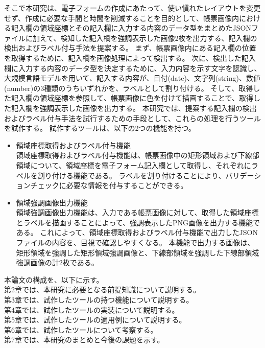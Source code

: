 そこで本研究は、電子フォームの作成にあたって、使い慣れたレイアウトを変更せず、作成に必要な手間と時間を削減することを目的として、帳票画像内における記入欄の領域座標とその記入欄に入力する内容のデータ型をまとめたJSONファイルに加えて、検知した記入欄を強調表示した画像2枚を出力する、記入欄の検出およびラベル付与手法を提案する。
まず、帳票画像内にある記入欄の位置を取得するために、記入欄を画像処理によって検出する。
次に、検出した記入欄に入力する内容のデータ型を決定するために、入力内容を示す文字を認識し、大規模言語モデルを用いて、記入する内容が、日付(date)、文字列(string)、数値(number)の3種類のうちいずれかを、ラベルとして割り付ける。
そして、取得した記入欄の領域座標を参照して、帳票画像に色を付けて描画することで、取得した記入欄を強調表示した画像を出力する。
本研究では、提案する記入欄の検出およびラベル付与手法を試行するための手段として、これらの処理を行うツールを試作する。
試作するツールは、以下の2つの機能を持つ。

\begin{itemize}
    \item 領域座標取得およびラベル付与機能\\
        領域座標取得およびラベル付与機能は、帳票画像中の矩形領域および下線部領域について、領域座標を電子フォーム記入欄として取得し、それぞれにラベルを割り付ける機能である。
        ラベルを割り付けることにより、バリデーションチェック\cite{バリデーションチェック}に必要な情報を付与することができる。
    \item 領域強調画像出力機能\\
        領域強調画像出力機能は、入力である帳票画像に対して、取得した領域座標とラベルを描画することによって、強調表示したPNG画像を出力する機能である。
        これによって、領域座標取得およびラベル付与機能で出力したJSONファイルの内容を、目視で確認しやすくなる。
        本機能で出力する画像は、矩形領域を強調した矩形領域強調画像と、下線部領域を強調した下線部領域強調画像の計2枚である。
\end{itemize}

本論文の構成を、以下に示す。\\
第2章では、本研究に必要となる前提知識について説明する。\\
第3章では、試作したツールの持つ機能について説明する。\\
第4章では、試作したツールの実装について説明する。\\
第5章では、試作したツールの適用例について説明する。\\
第6章では、試作したツールについて考察する。\\
第7章では、本研究のまとめと今後の課題を示す。